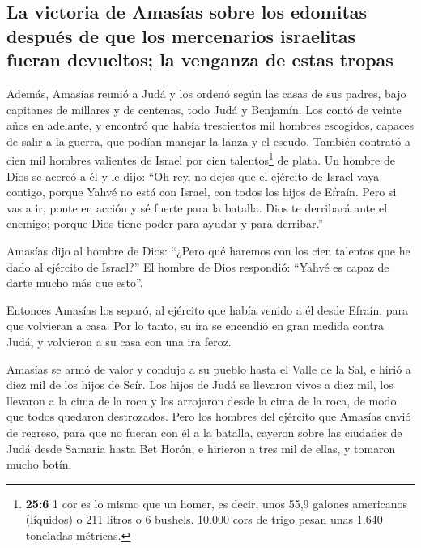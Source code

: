 \begin{paracol}{2}
\hypertarget{la-victoria-de-amasuxedas-sobre-los-edomitas-despuuxe9s-de-que-los-mercenarios-israelitas-fueran-devueltos-la-venganza-de-estas-tropas}{%
\subsection{La victoria de Amasías sobre los edomitas después de que los
mercenarios israelitas fueran devueltos; la venganza de estas
tropas}\label{la-victoria-de-amasuxedas-sobre-los-edomitas-despuuxe9s-de-que-los-mercenarios-israelitas-fueran-devueltos-la-venganza-de-estas-tropas}}

 Además, Amasías reunió a Judá y los ordenó según las
casas de sus padres, bajo capitanes de millares y de centenas, todo Judá
y Benjamín. Los contó de veinte años en adelante, y encontró que había
trescientos mil hombres escogidos, capaces de salir a la guerra, que
podían manejar la lanza y el escudo.  También contrató a
cien mil hombres valientes de Israel por cien talentos\footnote{\textbf{25:6}
  1 cor es lo mismo que un homer, es decir, unos 55,9 galones americanos
  (líquidos) o 211 litros o 6 bushels. 10.000 cors de trigo pesan unas
  1.640 toneladas métricas.} de plata.  Un hombre de Dios
se acercó a él y le dijo: ``Oh rey, no dejes que el ejército de Israel
vaya contigo, porque Yahvé no está con Israel, con todos los hijos de
Efraín.  Pero si vas a ir, ponte en acción y sé fuerte
para la batalla. Dios te derribará ante el enemigo; porque Dios tiene
poder para ayudar y para derribar.''

 Amasías dijo al hombre de Dios: ``¿Pero qué haremos con
los cien talentos que he dado al ejército de Israel?'' El hombre de Dios
respondió: ``Yahvé es capaz de darte mucho más que esto''.

 Entonces Amasías los separó, al ejército que había
venido a él desde Efraín, para que volvieran a casa. Por lo tanto, su
ira se encendió en gran medida contra Judá, y volvieron a su casa con
una ira feroz.

 Amasías se armó de valor y condujo a su pueblo hasta el
Valle de la Sal, e hirió a diez mil de los hijos de Seír.
 Los hijos de Judá se llevaron vivos a diez mil, los
llevaron a la cima de la roca y los arrojaron desde la cima de la roca,
de modo que todos quedaron destrozados.  Pero los hombres
del ejército que Amasías envió de regreso, para que no fueran con él a
la batalla, cayeron sobre las ciudades de Judá desde Samaria hasta Bet
Horón, e hirieron a tres mil de ellas, y tomaron mucho botín.


\end{paracol}
